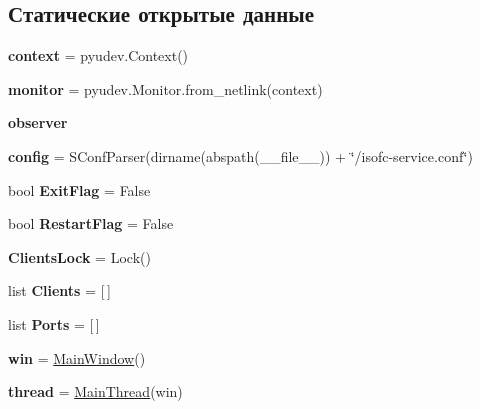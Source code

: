 \subsection*{Статические открытые данные}
\begin{DoxyCompactItemize}
\item 
\mbox{\label{classisofc-service_1_1MainThread_adc6bf80a4326a49405f87bb0b25a2c73}} 
{\bfseries context} = pyudev.\+Context()
\item 
\mbox{\label{classisofc-service_1_1MainThread_a6396e6b91b66ca3179d054665dfa5199}} 
{\bfseries monitor} = pyudev.\+Monitor.\+from\+\_\+netlink(context)
\item 
{\bfseries observer}
\item 
\mbox{\label{classisofc-service_1_1MainThread_addc972a940dbd899a7287bef711ce6a8}} 
{\bfseries config} = S\+Conf\+Parser(dirname(abspath(\+\_\+\+\_\+file\+\_\+\+\_\+)) + \char`\"{}/isofc-\/service.\+conf\char`\"{})
\item 
\mbox{\label{classisofc-service_1_1MainThread_a8bcf580d3a0364f84353d845941a4676}} 
bool {\bfseries Exit\+Flag} = False
\item 
\mbox{\label{classisofc-service_1_1MainThread_aa82503fa0f030ffdb188046a25f7612a}} 
bool {\bfseries Restart\+Flag} = False
\item 
\mbox{\label{classisofc-service_1_1MainThread_afc3388b2c4d1a5a6241e2d462bd2287d}} 
{\bfseries Clients\+Lock} = Lock()
\item 
\mbox{\label{classisofc-service_1_1MainThread_ac4b2fea6b1f99662afe689cad20a1956}} 
list {\bfseries Clients} = \mbox{[}$\,$\mbox{]}
\item 
\mbox{\label{classisofc-service_1_1MainThread_a0da9eba6106ca5e8a320f9b6574e4df3}} 
list {\bfseries Ports} = \mbox{[}$\,$\mbox{]}
\item 
\mbox{\label{classisofc-service_1_1MainThread_a5a24f34cb7ef8d92a0cd5b1a9332a285}} 
{\bfseries win} = \mbox{\hyperlink{classisofc-service_1_1MainWindow}{Main\+Window}}()
\item 
\mbox{\label{classisofc-service_1_1MainThread_a441ed4d7c818de2576c6fbc6aa3b71d4}} 
{\bfseries thread} = \mbox{\hyperlink{classisofc-service_1_1MainThread}{Main\+Thread}}(win)
\end{DoxyCompactItemize}


